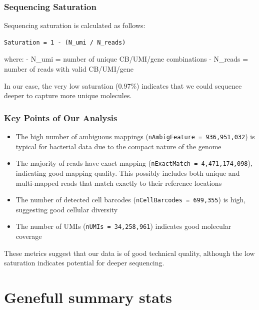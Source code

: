 \documentclass[
  11pt,
  a4paper,
]{report}
\providecommand{\tightlist}{%
  \setlength{\itemsep}{0pt}\setlength{\parskip}{0pt}}\usepackage{longtable,booktabs,array}
\begin{document}
\subsubsection{Sequencing Saturation}\label{sequencing-saturation}

Sequencing saturation is calculated as follows:

\begin{verbatim}
Saturation = 1 - (N_umi / N_reads)
\end{verbatim}

where: - N\_umi = number of unique CB/UMI/gene combinations - N\_reads =
number of reads with valid CB/UMI/gene

In our case, the very low saturation (0.97\%) indicates that we could
sequence deeper to capture more unique molecules.

\subsubsection{Key Points of Our
Analysis}\label{key-points-of-our-analysis}

\begin{itemize}
\tightlist
\item
  The high number of ambiguous mappings
  (\texttt{nAmbigFeature\ =\ 936,951,032}) is typical for bacterial data
  due to the compact nature of the genome
\item
  The majority of reads have exact mapping
  (\texttt{nExactMatch\ =\ 4,471,174,098}), indicating good mapping
  quality. This possibly includes both unique and multi-mapped reads
  that match exactly to their reference locations
\item
  The number of detected cell barcodes
  (\texttt{nCellBarcodes\ =\ 699,355}) is high, suggesting good cellular
  diversity
\item
  The number of UMIs (\texttt{nUMIs\ =\ 34,258,961}) indicates good
  molecular coverage
\end{itemize}

These metrics suggest that our data is of good technical quality,
although the low saturation indicates potential for deeper sequencing.

\section{Genefull summary stats}\label{genefull-summary-stats}
\end{document}
